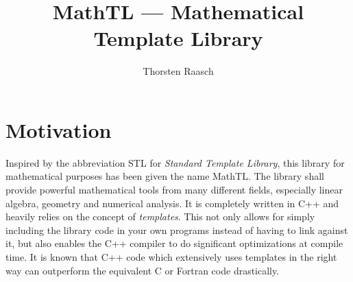 \documentclass{article}
\begin{document}
\title{MathTL --- Mathematical Template Library}
\author{Thorsten Raasch}
\maketitle

\section{Motivation}
Inspired by the abbreviation STL for \textit{Standard Template Library},
this library for mathematical purposes has been given the name MathTL.
The library shall provide powerful mathematical tools from many different fields,
especially linear algebra, geometry and numerical analysis.
It is completely written in C++ and heavily relies on the concept of \textit{templates}.
This not only allows for simply including the library code
in your own programs instead of having to link against it,
but also enables the C++ compiler to do significant optimizations
at compile time. It is known that C++ code which extensively uses templates in the right way
can outperform the equivalent C or Fortran code drastically.
\end{document}
